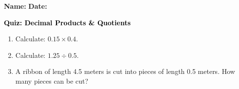 \documentclass[12pt, letterpaper, fleqn]{article}
\begin{document}
\textbf{Name:} \underline{\hspace{5cm}}
\hfill
\textbf{Date:} \underline{\hspace{3cm}}\\

\begin{tcolorbox}[colback=customteal!20]
    \large\textcolor{black}{\textbf{Quiz: Decimal Products & Quotients}}
\end{tcolorbox}
\begin{enumerate}[itemsep=3.5cm, leftmargin=0.6cm]
\item Calculate: $0.15 \times 0.4$.
\vspace{3.5cm}
\item Calculate: $1.25 \div 0.5$.
\vspace{3.5cm}
\item A ribbon of length 4.5 meters is cut into pieces of length 0.5 meters. How many pieces can be cut?
\end{enumerate}
\end{document}
